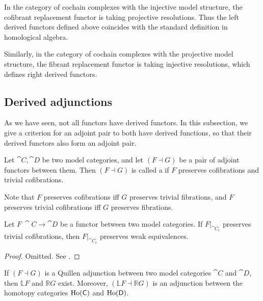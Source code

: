 \begin{example}
    In the category of cochain complexes with the injective model structure,
    the cofibrant replacement functor is taking projective resolutions.
    Thus the left derived functors defined above coincides with
    the standard definition in homological algebra.

    Similarly, in the category of cochain complexes with the projective model structure,
    the fibrant replacement functor is taking injective resolutions,
    which defines right derived functors. \varqed
\end{example}

\subsection{Derived adjunctions}

As we have seen, not all functors have derived functors.
In this subsection,
we give a criterion for an adjoint pair to both have derived functions,
so that their derived functors also form an adjoint pair.

\begin{definition}
    Let $\cat C,\cat D$ be two model categories,
    and let $(F\dashv G)$ be a pair of adjoint functors between them.
    Then $(F\dashv G)$ is called a 
    if $F$ preserves cofibrations and trivial cofibrations.
\end{definition}

Note that $F$ preserves cofibrations iff $G$ preserves trivial fibrations,
and $F$ preserves trivial cofibrations iff $G$ preserves fibrations.

\begin{lemma}
    Let $F\:\cat C\to\cat D$ be a functor between two model categories.
    If $F|_{\cat C_{\mathrm c}}$ preserves trivial cofibrations,
    then $F|_{\cat C_{\mathrm c}}$ preserves weak equivalences.
\end{lemma}

\begin{proof}
    Omitted. See \cite[Lemma~1.1.12]{hovey}.
\end{proof}

\begin{corollary}
    If $(F\dashv G)$ is a Quillen adjunction
    between two model categories $\cat C$ and $\cat D$,
    then $\mathbb LF$ and $\mathbb RG$ exist.
    Moreover, $(\mathbb LF\dashv\mathbb RG)$
    is an adjunction between the homotopy categories $\operatorname{Ho}(\textup{\textsf{C}})$ and $\operatorname{Ho}(\textup{\textsf{D}})$.
\end{corollary}

